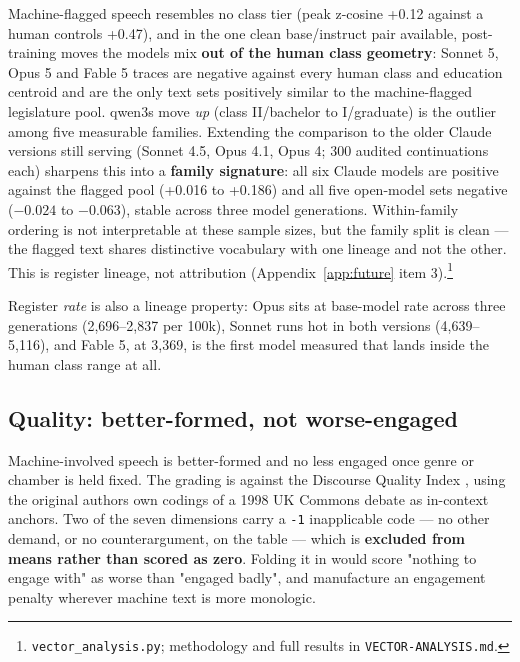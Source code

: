 Machine-flagged speech resembles no class tier (peak z-cosine +0.12 against a
human control\textquotesingle s +0.47), and in the one clean base/instruct pair available,
post-training moves the model\textquotesingle s mix \textbf{out of the human class geometry}:
Sonnet 5, Opus 5 and Fable 5 traces are negative against every human class
and education centroid and are the only text sets positively similar to the
machine-flagged legislature pool. qwen3\textquotesingle s move \emph{up} (class II/bachelor to
I/graduate) is the outlier among five measurable families. Extending the
comparison to the older Claude versions still serving (Sonnet 4.5, Opus 4.1,
Opus 4; 300 audited continuations each) sharpens this into a \textbf{family
signature}: all six Claude models are positive against the flagged pool
(+0.016 to +0.186) and all five open-model sets negative (\(-0.024\) to \(-0.063\)),
stable across three model generations. Within-family ordering is not
interpretable at these sample sizes, but the family split is clean --- the
flagged text shares distinctive vocabulary with one lineage and not the
other. This is register lineage, not attribution (Appendix~\ref{app:future} item 3).\footnote{\texttt{vector\_analysis.py}; methodology and full results in
  \texttt{VECTOR-ANALYSIS.md}.}

Register \emph{rate} is also a lineage property: Opus sits at base-model rate
across three generations (2,696--2,837 per 100k), Sonnet runs hot in both
versions
(4,639--5,116), and Fable 5, at 3,369, is the first model measured that lands
inside the human class range at all.

\subsection{Quality: better-formed, not worse-engaged}\label{sec:quality}

Machine-involved speech is better-formed and no less engaged once genre or
chamber is held fixed. The grading is against the Discourse Quality Index
\cite{steenbergen2003}, using the original
authors\textquotesingle{} own codings of a 1998 UK Commons debate as in-context anchors. Two
of the seven dimensions carry a \texttt{-1} inapplicable code --- no other demand, or
no counterargument, on the table --- which is \textbf{excluded from means rather than
scored as zero}. Folding it in would score "nothing to engage with" as worse
than "engaged badly", and manufacture an engagement penalty wherever machine
text is more monologic.

